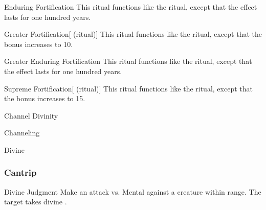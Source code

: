 \lowercase{\hypertarget{spell:Enduring Fortification}{}}\label{spell:Enduring Fortification}
\begin{apability}[\nth{3}]{\hypertarget{spell:Enduring Fortification}{Enduring Fortification}}
This ritual functions like the  ritual, except that the effect lasts for one hundred years.
\end{apability}
\vspace{0.25em}



\lowercase{\hypertarget{spell:Greater Fortification}{}}\label{spell:Greater Fortification}
\begin{attuneability}[\nth{3}]{\hypertarget{spell:Greater Fortification}{Greater Fortification}}[ (ritual)]
This ritual functions like the  ritual, except that the  bonus increases to 10.
\end{attuneability}
\vspace{0.25em}



\lowercase{\hypertarget{spell:Greater Enduring Fortification}{}}\label{spell:Greater Enduring Fortification}
\begin{apability}[\nth{5}]{\hypertarget{spell:Greater Enduring Fortification}{Greater Enduring Fortification}}
This ritual functions like the  ritual, except that the effect lasts for one hundred years.
\end{apability}
\vspace{0.25em}



\lowercase{\hypertarget{spell:Supreme Fortification}{}}\label{spell:Supreme Fortification}
\begin{attuneability}[\nth{6}]{\hypertarget{spell:Supreme Fortification}{Supreme Fortification}}[ (ritual)]
This ritual functions like the  ritual, except that the  bonus increases to 15.
\end{attuneability}
\vspace{0.25em}


\newpage
\begin{spellsection}{Channel Divinity}

\begin{spellheader}
\end{spellheader}


 Channeling

 Divine

\subsubsection{Cantrip}


\begin{freeability}{Divine Judgment}
Make an attack vs. Mental against a creature within \rngmed range.
\hit The target takes divine .
\end{freeability}

\end{spellsection}


